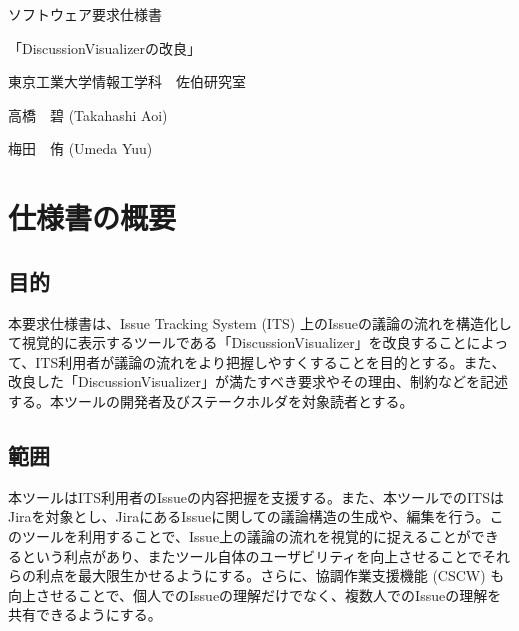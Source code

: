 \documentclass[12pt, oneside]{jreport}
\begin{document}
\begin{center}

{\Huge ソフトウェア要求仕様書}

\vspace{15mm}

{\huge 「DiscussionVisualizerの改良」}

\vspace{30mm}

{\Large 東京工業大学情報工学科　佐伯研究室}

\vspace{10mm}

{\large 高橋　碧 (Takahashi Aoi)}

\vspace{1mm}

{\large 梅田　侑 (Umeda Yuu)}

\end{center}

\newpage 


\tableofcontents
\clearpage



\chapter{仕様書の概要}

	\section{目的}
	本要求仕様書は、Issue Tracking System (ITS) 上のIssueの議論の流れを構造化して視覚的に表示するツールである「DiscussionVisualizer」を改良することによって、ITS利用者が議論の流れをより把握しやすくすることを目的とする。また、改良した「DiscussionVisualizer」が満たすべき要求やその理由、制約などを記述する。本ツールの開発者及びステークホルダを対象読者とする。
	
	\section{範囲}
	本ツールはITS利用者のIssueの内容把握を支援する。また、本ツールでのITSはJiraを対象とし、JiraにあるIssueに関しての議論構造の生成や、編集を行う。このツールを利用することで、Issue上の議論の流れを視覚的に捉えることができるという利点があり、またツール自体のユーザビリティを向上させることでそれらの利点を最大限生かせるようにする。さらに、協調作業支援機能 (CSCW) も向上させることで、個人でのIssueの理解だけでなく、複数人でのIssueの理解を共有できるようにする。
	
\end{document}
